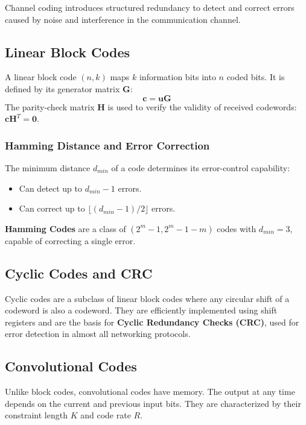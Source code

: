 
Channel coding introduces structured redundancy to detect and correct errors caused by noise and interference in the communication channel.

\subsection{Linear Block Codes}
A linear block code $(n, k)$ maps $k$ information bits into $n$ coded bits. It is defined by its generator matrix $\mathbf{G}$:
\begin{equation}
    \mathbf{c} = \mathbf{uG}
\end{equation}
The parity-check matrix $\mathbf{H}$ is used to verify the validity of received codewords: $\mathbf{cH}^T = \mathbf{0}$.

\subsubsection{Hamming Distance and Error Correction}
The minimum distance $d_{min}$ of a code determines its error-control capability:
\begin{itemize}
    \item Can detect up to $d_{min}-1$ errors.
    \item Can correct up to $\lfloor (d_{min}-1)/2 \rfloor$ errors.
\end{itemize}
\textbf{Hamming Codes} are a class of $(2^m-1, 2^m-1-m)$ codes with $d_{min}=3$, capable of correcting a single error.

\subsection{Cyclic Codes and CRC}
Cyclic codes are a subclass of linear block codes where any circular shift of a codeword is also a codeword. They are efficiently implemented using shift registers and are the basis for \textbf{Cyclic Redundancy Checks (CRC)}, used for error detection in almost all networking protocols.

\subsection{Convolutional Codes}
Unlike block codes, convolutional codes have memory. The output at any time depends on the current and previous input bits. They are characterized by their constraint length $K$ and code rate $R$.

